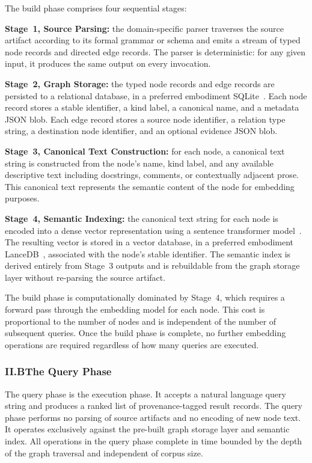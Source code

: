 \documentclass[12pt]{article}
\begin{document}
The build phase comprises four sequential stages:

\textbf{Stage~1, Source Parsing:} the domain-specific parser traverses the source
artifact according to its formal grammar or schema and emits a stream of typed
node records and directed edge records. The parser is deterministic: for any
given input, it produces the same output on every invocation.

\textbf{Stage~2, Graph Storage:} the typed node records and edge records are
persisted to a relational database, in a preferred embodiment SQLite~\cite{sqlite}.
Each node record stores a stable identifier, a kind label, a canonical name, and
a metadata JSON blob. Each edge record stores a source node identifier, a
relation type string, a destination node identifier, and an optional evidence
JSON blob.

\textbf{Stage~3, Canonical Text Construction:} for each node, a canonical text
string is constructed from the node's name, kind label, and any available
descriptive text including docstrings, comments, or contextually adjacent prose.
This canonical text represents the semantic content of the node for embedding
purposes.

\textbf{Stage~4, Semantic Indexing:} the canonical text string for each node is
encoded into a dense vector representation using a sentence transformer
model~\cite{reimers2019sbert}. The resulting vector is stored in a vector
database, in a preferred embodiment LanceDB~\cite{lancedb}, associated with the
node's stable identifier. The semantic index is derived entirely from Stage~3
outputs and is rebuildable from the graph storage layer without re-parsing the
source artifact.

The build phase is computationally dominated by Stage~4, which requires a forward
pass through the embedding model for each node. This cost is proportional to the
number of nodes and is independent of the number of subsequent queries. Once the
build phase is complete, no further embedding operations are required regardless
of how many queries are executed.

\subsubsection{II.B\quad The Query Phase}

The query phase is the execution phase. It accepts a natural language query string
and produces a ranked list of provenance-tagged result records. The query phase
performs no parsing of source artifacts and no encoding of new node text. It
operates exclusively against the pre-built graph storage layer and semantic index.
All operations in the query phase complete in time bounded by the depth of the
graph traversal and independent of corpus size.
\end{document}
